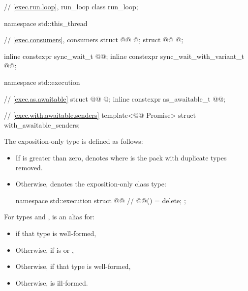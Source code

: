 \begin{codeblock}
{  // \ref{exec.run.loop}, run_loop
  class run_loop;
}

namespace std::this_thread {
  // \ref{exec.consumers}, consumers
  struct @@ { @\unspec@ };
  struct @@ { @\unspec@ };

  inline constexpr sync_wait_t @@{};
  inline constexpr sync_wait_with_variant_t @@{};
}

namespace std::execution {
  // \ref{exec.as.awaitable}
  struct @@ { @\unspec@ };
  inline constexpr as_awaitable_t @@{};

  // \ref{exec.with.awaitable.senders}
  template<@@ Promise>
    struct with_awaitable_senders;
}
\end{codeblock}

\pnum
The exposition-only type 
is defined as follows:
\begin{itemize}
\item
If  is greater than zero,
 denotes 
where  is the pack 
with duplicate types removed.
\item
Otherwise,  denotes
the exposition-only class type:
\begin{codeblock}
namespace std::execution {
  struct @@ {        // \expos
    @@() = delete;
  };
}
\end{codeblock}
\end{itemize}

\pnum
For types  and ,
 is an alias for:
\begin{itemize}
\item
{}
if that type is well-formed,
\item
Otherwise, 
if  is
 or ,
\item
Otherwise, 
if that type is well-formed,
\item
Otherwise,  is ill-formed.
\end{itemize}

